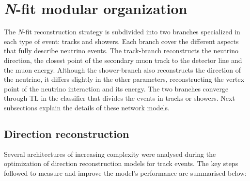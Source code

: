 %
%
%
%
%
%
%
%
%

\section{\emph{N}-fit modular organization}
\label{sec:workflow}

The $N$-fit reconstruction strategy is subdivided into two branches specialized in each type of event: tracks and showers. Each branch cover the different aspects that fully describe neutrino events. The track-branch reconstructs the neutrino direction, the closest point of the secondary muon track to the detector line and the muon energy. Although the shower-branch also reconstructs the direction of the neutrino, it differs slightly in the other parameters, reconstructing the vertex point of the neutrino interaction and its energy. The two branches converge through TL in the classifier that divides the events in tracks or showers. Next subsections explain the details of these network models.

\subsection{Direction reconstruction}
\label{subsec:direction}


Several architectures of increasing complexity were analysed during the optimization of direction reconstruction models for track events. The key steps followed to measure and improve the model's performance are summarised below:

